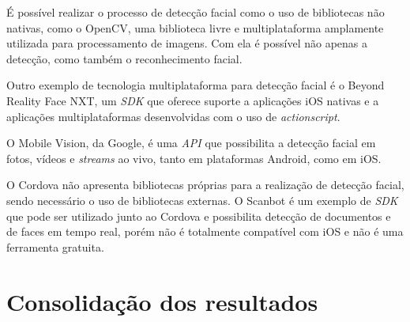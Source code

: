 É possível realizar o processo de detecção facial como o uso de bibliotecas não nativas, como o OpenCV, uma biblioteca livre e multiplataforma amplamente utilizada para processamento de imagens. Com ela é possível 
não apenas a detecção, como também o reconhecimento facial.

Outro exemplo de tecnologia multiplataforma para detecção facial é o Beyond Reality Face NXT, um \textit{SDK} que oferece suporte a aplicações iOS nativas e a aplicações multiplataformas desenvolvidas com o 
uso de \textit{actionscript}.%

O Mobile Vision, da Google, é uma \textit{API} que possibilita a detecção facial em fotos, vídeos e \textit{streams} ao vivo, tanto em plataformas Android, como em iOS.

O Cordova não apresenta bibliotecas próprias para a realização de detecção facial, sendo necessário o uso de bibliotecas externas. O Scanbot é um exemplo de \textit{SDK} que pode ser utilizado junto ao Cordova e 
possibilita detecção de documentos e de faces em tempo real, porém não é totalmente compatível com iOS e não é uma ferramenta gratuita. %

\section{Consolidação dos resultados} \label{sec:compa_conclu}

